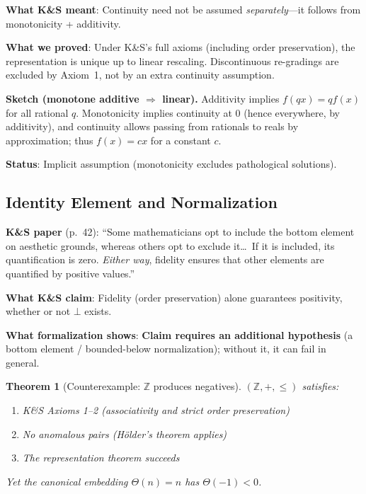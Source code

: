 \documentclass[11pt]{article}
\newtheorem{theorem}{Theorem}[section]
\begin{document}
\textbf{What K\&S meant}: Continuity need not be assumed \emph{separately}---it follows
from monotonicity + additivity.

\textbf{What we proved}: Under K\&S's full axioms (including order preservation), the
representation is unique up to linear rescaling. Discontinuous re-gradings are excluded
by Axiom~1, not by an extra continuity assumption.

\textbf{Sketch (monotone additive $\Rightarrow$ linear).}
Additivity implies $f(qx)=qf(x)$ for all rational $q$.
Monotonicity implies continuity at $0$ (hence everywhere, by additivity), and continuity allows
passing from rationals to reals by approximation; thus $f(x)=cx$ for a constant $c$.

\textbf{Status}: Implicit assumption (monotonicity excludes pathological solutions).

\subsection{Identity Element and Normalization}

\textbf{K\&S paper} (p.~42): ``Some mathematicians opt to include the bottom element
on aesthetic grounds, whereas others opt to exclude it\ldots\ If it is included, its
quantification is zero. \emph{Either way}, fidelity ensures that other elements are
quantified by positive values.''

\textbf{What K\&S claim}: Fidelity (order preservation) alone guarantees positivity,
whether or not $\bot$ exists.

\textbf{What formalization shows}: \textbf{Claim requires an additional hypothesis}
(a bottom element / bounded-below normalization); without it, it can fail in general.

\begin{theorem}[Counterexample: $\mathbb{Z}$ produces negatives]
$(\mathbb{Z}, +, \leq)$ satisfies:
\begin{enumerate}[noitemsep]
\item K\&S Axioms 1--2 (associativity and strict order preservation)
\item No anomalous pairs (H\"{o}lder's theorem applies)
\item The representation theorem succeeds
\end{enumerate}
Yet the canonical embedding $\Theta(n) = n$ has $\Theta(-1) < 0$.
\end{theorem}
\end{document}

